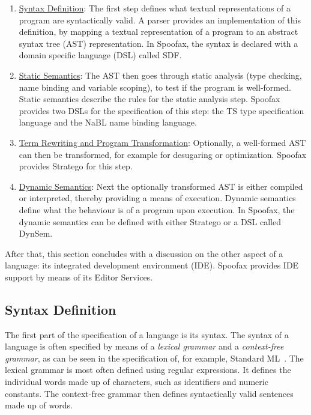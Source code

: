 \begin{enumerate}
\item \hyperref[sec:syntax-def]{Syntax Definition}: The first step defines what textual
representations of a program are syntactically valid. A parser
provides an implementation of this definition, by mapping a textual
representation of a program to an abstract syntax tree (AST)
representation. In Spoofax, the syntax is declared with a domain
specific language (DSL) called SDF.
\item \hyperref[sec:static-analysis]{Static Semantics}: The AST then goes through static analysis (type
checking, name binding and variable scoping), to test if the
program is well-formed. Static semantics describe the rules for the
static analysis step. Spoofax provides two DSLs for the
specification of this step: the TS type specification language and
the NaBL name binding language.
\item \hyperref[sec:term-rewrite]{Term Rewriting and Program Transformation}: Optionally, a
well-formed AST can then be transformed, for example for desugaring
or optimization. Spoofax provides Stratego for this step.
\item \hyperref[sec:dynamic-semantics]{Dynamic Semantics}: Next the optionally transformed AST is either
compiled or interpreted, thereby providing a means of
execution. Dynamic semantics define what the behaviour is of a
program upon execution. In Spoofax, the dynamic semantics can be
defined with either Stratego or a DSL called DynSem.
\end{enumerate}

After that, this section concludes with a discussion on the other
aspect of a language: its integrated development environment
(IDE). Spoofax provides IDE support by means of its Editor Services.
\subsection{Syntax Definition}
\label{sec:syntax-def}
The first part of the specification of a language is its syntax. The
syntax of a language is often specified by means of a \emph{lexical
grammar} and a \emph{context-free grammar}, as can be seen in the
specification of, for example, Standard ML~\cite{Milner97}. The
lexical grammar is most often defined using regular expressions. It
defines the individual words made up of characters, such as
identifiers and numeric constants. The context-free grammar then
defines syntactically valid sentences made up of words.

